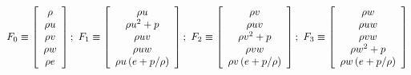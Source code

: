 \[{F_0} \equiv \left[ {\begin{array}{*{20}{c}}
\rho \\
{\rho u}\\
{\rho v}\\
{\rho w}\\
{\rho e}
\end{array}} \right];\,\,{F_1} \equiv \left[ {\begin{array}{*{20}{c}}
{\rho u}\\
{\rho {u^2} + p}\\
{\rho uv}\\
{\rho uw}\\
{\rho u\left( {e + {p \mathord{\left/
 {\vphantom {p \rho }} \right.
 \kern-\nulldelimiterspace} \rho }} \right)}
\end{array}} \right];\,\,{F_2} \equiv \left[ {\begin{array}{*{20}{c}}
{\rho v}\\
{\rho uv}\\
{\rho {v^2} + p}\\
{\rho vw}\\
{\rho v\left( {e + {p \mathord{\left/
 {\vphantom {p \rho }} \right.
 \kern-\nulldelimiterspace} \rho }} \right)}
\end{array}} \right];\,\,{F_3} \equiv \left[ {\begin{array}{*{20}{c}}
{\rho w}\\
{\rho uw}\\
{\rho vw}\\
{\rho {w^2} + p}\\
{\rho w\left( {e + {p \mathord{\left/
 {\vphantom {p \rho }} \right.
 \kern-\nulldelimiterspace} \rho }} \right)}
\end{array}} \right]\]

